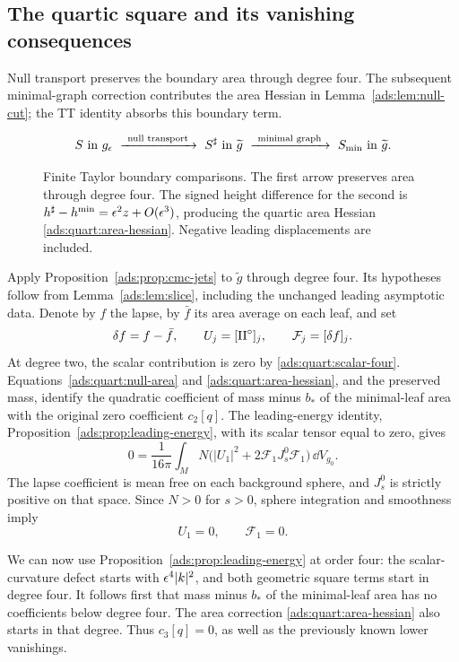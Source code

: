 \subsection{The quartic square and its vanishing consequences}

Null transport preserves the boundary area through degree four.
The subsequent minimal-graph correction contributes the area
Hessian in Lemma~\ref{ads:lem:null-cut}; the TT identity absorbs this
boundary term.

\begin{figure}[ht]
\centering
\[
 S\text{ in }g_\eps
 \ \xrightarrow{\ \text{null transport}\ }\ 
 S^\sharp\text{ in }\widetilde g
 \ \xrightarrow{\ \text{minimal graph}\ }\ 
 S_{\min}\text{ in }\widetilde g .
\]
\caption{Finite Taylor boundary comparisons. The first arrow preserves
area through degree four. The signed height difference for the second
is $h^\sharp-h^{\min}=\epsilon^2z+O(\epsilon^3)$, producing the quartic area
Hessian \eqref{ads:quart:area-hessian}. Negative leading displacements
are included.}
\label{ads:fig:boundary-comparisons}
\end{figure}

Apply Proposition~\ref{ads:prop:cmc-jets} to \(\widetilde g\) through
degree four.  Its hypotheses follow from
Lemma~\ref{ads:lem:slice}, including the unchanged leading asymptotic
data.  Denote by \(f\) the lapse, by \(\bar f\) its area average on
each leaf, and set
\[
 \delta f=f-\bar f,\qquad
 U_j=[\mathrm{II}^{\circ}]_j,\qquad \mathcal F_j=[\delta f]_j.
\]
At degree two, the scalar contribution is zero by
\eqref{ads:quart:scalar-four}.  Equations~\eqref{ads:quart:null-area} and
\eqref{ads:quart:area-hessian}, and the preserved mass, identify the
quadratic coefficient of mass minus \(b_*\) of the minimal-leaf area
with the original zero coefficient \(c_2[q]\).  The leading-energy
identity, Proposition~\ref{ads:prop:leading-energy}, with its scalar
tensor equal to zero, gives
\[
 0=\frac1{16\pi}\int_M N
       \bigl(|U_1|^2+2\mathcal F_1J_s^0\mathcal F_1\bigr)\,\dd V_{g_0}.
\]
The lapse coefficient is mean free on each background sphere, and
\(J_s^0\) is strictly positive on that space.  Since \(N>0\) for
\(s>0\), sphere integration and smoothness imply
\begin{equation}
 U_1=0,\qquad \mathcal F_1=0.
 \label{ads:quart:first-geometric-zero}
\end{equation}

We can now use Proposition~\ref{ads:prop:leading-energy} at order four:
the scalar-curvature defect starts with
\(\epsilon^4|k|^2\), and both geometric square terms start in degree
four.  It follows first that mass minus \(b_*\) of the minimal-leaf
area has no coefficients below degree four.  The area correction
\eqref{ads:quart:area-hessian} also starts in that degree.  Thus
\(c_3[q]=0\), as well as the previously known lower vanishings.

